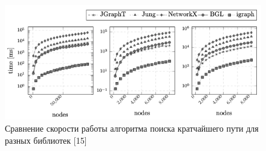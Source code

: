 \begin{figure}[ht!]
    \center
    \includegraphics [scale=0.75] {my_folder/myimg//3}
    \caption{Сравнение скорости работы алгоритма поиска кратчайшего пути для разных библиотек [15]}
\end{figure}


